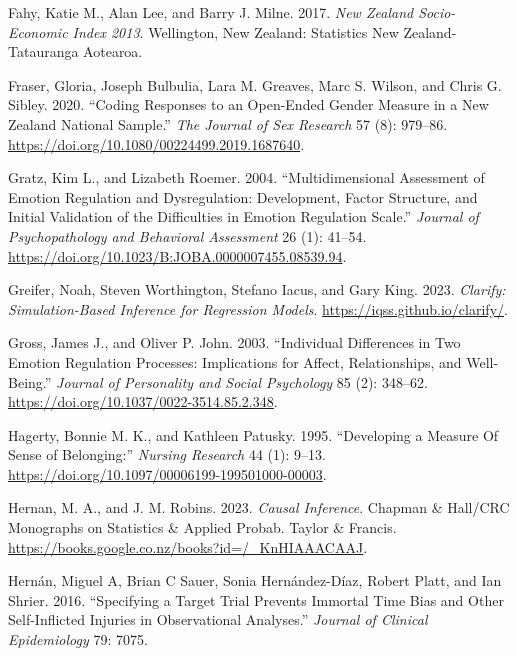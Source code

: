\documentclass[
  letterpaper,
  DIV=11,
  numbers=noendperiod]{scrartcl}
\newlength{\cslhangindent}
\newlength{\cslentryspacingunit} %
\newenvironment{CSLReferences}[2] %
 {%
  \setlength{\parindent}{0pt}
  \ifodd #1
  \let\oldpar\par
  \def\par{\hangindent=\cslhangindent\oldpar}
  \fi
  \setlength{\parskip}{#2\cslentryspacingunit}
 }%
 {}
\begin{document}
\begin{CSLReferences}{1}{0}
\leavevmode{}%
Fahy, Katie M., Alan Lee, and Barry J. Milne. 2017. \emph{New Zealand
Socio-Economic Index 2013}. Wellington, New Zealand: Statistics New
Zealand-Tatauranga Aotearoa.

\leavevmode{}%
Fraser, Gloria, Joseph Bulbulia, Lara M. Greaves, Marc S. Wilson, and
Chris G. Sibley. 2020. {``Coding Responses to an Open-Ended Gender
Measure in a New Zealand National Sample.''} \emph{The Journal of Sex
Research} 57 (8): 979--86.
\url{https://doi.org/10.1080/00224499.2019.1687640}.

\leavevmode{}%
Gratz, Kim L., and Lizabeth Roemer. 2004. {``Multidimensional Assessment
of Emotion Regulation and Dysregulation: Development, Factor Structure,
and Initial Validation of the Difficulties in Emotion Regulation
Scale.''} \emph{Journal of Psychopathology and Behavioral Assessment} 26
(1): 41--54. \url{https://doi.org/10.1023/B:JOBA.0000007455.08539.94}.

\leavevmode{}%
Greifer, Noah, Steven Worthington, Stefano Iacus, and Gary King. 2023.
\emph{Clarify: Simulation-Based Inference for Regression Models}.
\url{https://iqss.github.io/clarify/}.

\leavevmode{}%
Gross, James J., and Oliver P. John. 2003. {``Individual Differences in
Two Emotion Regulation Processes: Implications for Affect,
Relationships, and Well-Being.''} \emph{Journal of Personality and
Social Psychology} 85 (2): 348--62.
\url{https://doi.org/10.1037/0022-3514.85.2.348}.

\leavevmode{}%
Hagerty, Bonnie M. K., and Kathleen Patusky. 1995. {``Developing a
Measure Of Sense of Belonging:''} \emph{Nursing Research} 44 (1): 9--13.
\url{https://doi.org/10.1097/00006199-199501000-00003}.

\leavevmode{}%
Hernan, M. A., and J. M. Robins. 2023. \emph{Causal Inference}. Chapman
\& Hall/CRC Monographs on Statistics \& Applied Probab. Taylor \&
Francis. \url{https://books.google.co.nz/books?id=/_KnHIAAACAAJ}.

\leavevmode{}%
Hernán, Miguel A, Brian C Sauer, Sonia Hernández-Díaz, Robert Platt, and
Ian Shrier. 2016. {``Specifying a Target Trial Prevents Immortal Time
Bias and Other Self-Inflicted Injuries in Observational Analyses.''}
\emph{Journal of Clinical Epidemiology} 79: 7075.


\end{CSLReferences}
\end{document}
